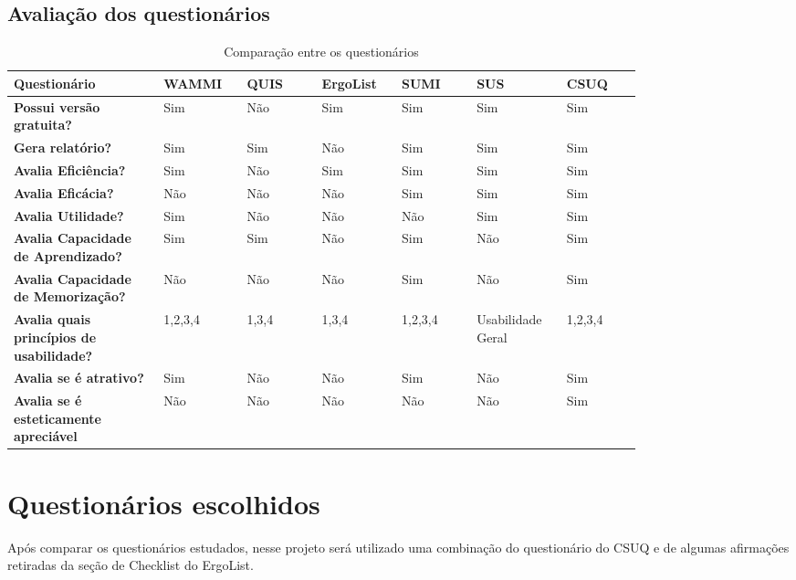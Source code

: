 \subsection{Avaliação dos questionários}
\begin{table}[t]
\caption{Comparação entre os questionários}
\label{tab:questionarios}
  \begin{tabular}{p{0.20\linewidth}p{0.10\linewidth}p{0.10\linewidth}p{0.10\linewidth}p{0.10\linewidth}p{0.10\linewidth}p{0.10\linewidth}}
  \hline
  \textbf{Questionário} & WAMMI & QUIS & ErgoList & SUMI & SUS & CSUQ \\

  \hline

  \textbf{Possui versão gratuita?} & Sim & Não & Sim & Sim & Sim & Sim \\
  \textbf{Gera relatório?} & Sim & Sim & Não & Sim & Sim & Sim \\
  \textbf{Avalia Eficiência?} & Sim & Não & Sim & Sim & Sim & Sim \\
  \textbf{Avalia Eficácia?} & Não & Não & Não & Sim & Sim & Sim \\
  \textbf{Avalia Utilidade?} & Sim & Não & Não & Não & Sim & Sim \\
  \textbf{Avalia Capacidade de Aprendizado?} & Sim & Sim & Não & Sim & Não & Sim \\
  \textbf{Avalia Capacidade de Memorização?} & Não & Não & Não & Sim & Não & Sim \\
  \textbf{Avalia quais princípios de usabilidade?} & 1,2,3,4 & 1,3,4 & 1,3,4 & 1,2,3,4 & Usabilidade Geral & 1,2,3,4 \\
  \textbf{Avalia se é atrativo?} & Sim & Não & Não & Sim & Não & Sim \\
  \textbf{Avalia se é esteticamente apreciável} & Não & Não & Não & Não & Não & Sim \\

  \hline

  \end{tabular}
\end{table}

\section{Questionários escolhidos}
Após comparar os questionários estudados, nesse projeto será utilizado 
uma combinação do questionário do CSUQ e de algumas afirmações retiradas da seção de Checklist do ErgoList.